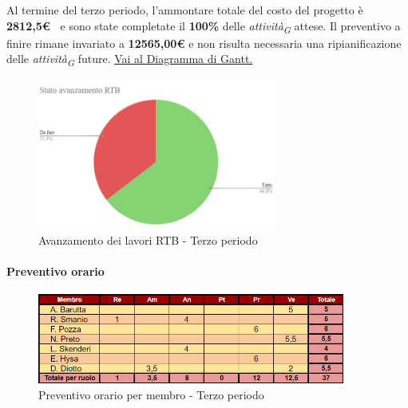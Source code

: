 \vspace{0.5cm}

Al termine del terzo periodo, l'ammontare totale del costo del progetto è \textbf{ 2812,5\euro\ } e sono state completate il \textbf{100\%} delle \textit{attività}\textsubscript{\textit{G}} attese.
Il preventivo a finire rimane invariato a \textbf{12565,00€} e non risulta necessaria una ripianificazione delle \textit{attività}\textsubscript{\textit{G}} future.
\href{https://github.com/orgs/ByteOps-swe/projects/3/views/1?sortedBy%5Bdirection%5D=asc&sortedBy%5BcolumnId%5D=64182560}{Vai al Diagramma di Gantt.}

\pagebreak

\begin{figure}[H]
    \centering
    \begin{minipage}[b]{0.70\textwidth}
        \centering
        \includegraphics[width=0.7\textwidth]{../Images/avanzamento3Periodo.png}
        \caption{Avanzamento dei lavori RTB - Terzo periodo}
        \label{fig:Avanzamento_RTB_3}
    \end{minipage}
\end{figure}

\paragraph{Preventivo orario} 

\begin{figure}[H]
    \centering
    \includegraphics[width=0.9\textwidth]{../Images/preventivoOrario3Periodo.png}
    \caption{Preventivo orario per membro - Terzo periodo}
    \label{fig:Preventivo_orario_3}
\end{figure}

